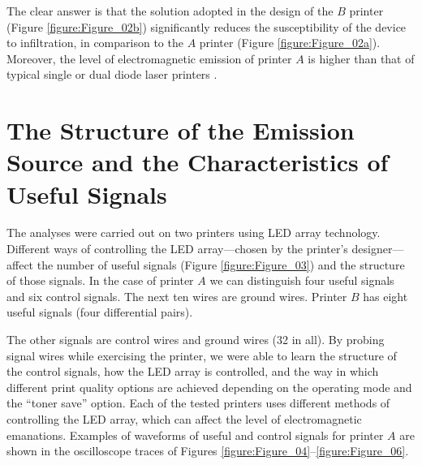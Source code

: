 \documentclass[letterpaper,journal]{ieeetran}
\begin{document}
The clear answer is that the solution adopted in the design of the $B$
printer (Figure \ref{figure:Figure_02b}) significantly reduces the
susceptibility of the device to infiltration, in comparison to the $A$
printer (Figure \ref{figure:Figure_02a}). Moreover, the level of
electromagnetic emission of printer $A$ is higher than that of
typical single or dual diode laser printers \cite{Kubiak2014b}.

\section{The Structure of the Emission Source and the Characteristics of
Useful Signals}

The analyses were carried out on two printers using LED array technology.
Different ways of controlling the LED array---chosen by the printer's
designer---affect the number of useful signals (Figure
\ref{figure:Figure_03}) and the structure of those signals. In the case of
printer $A$ we can distinguish four useful signals and six control
signals. The next ten wires are ground wires. Printer $B$ has eight
useful signals (four differential pairs).

\begin{figure*}[!ht]
    \centering
    \hfill
    \caption{Ribbon cable supplying useful signals to the LED array: (a)
        Printer $A$, (b) Printer $B$.}
    \label{figure:Figure_03}
\end{figure*}

The other signals are control wires and ground wires (32 in all). By
probing signal wires while exercising the printer, we were able to learn the
structure of the control signals, how the LED array is controlled, and the
way in which different print quality
options are achieved depending on the operating mode and the ``toner save''
option. Each of the tested printers uses different methods of controlling the
LED array, which can affect the level of electromagnetic emanations. Examples
of waveforms of useful and control signals for printer $A$ are shown
in the oscilloscope traces of Figures
\ref{figure:Figure_04}--\ref{figure:Figure_06}.

\begin{figure*}[ht]
    \centering
    \hfill
    \caption{Waveforms of useful signals on pins 2 (lower trace) and 5
        (upper trace) of printer $A$ for: a) the 300\,dpi mode and the
        Best option, b) the 300\,dpi mode and the Eco option.}

    \label{figure:Figure_04}
\end{figure*}
\end{document}
